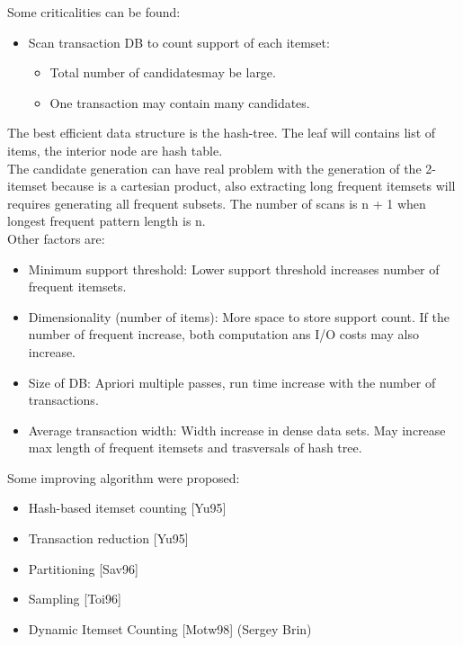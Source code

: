 \documentclass[12pt]{article}
\begin{document}
Some criticalities can be found:
\begin{itemize}
  \item Scan transaction DB to count support of each itemset:
  \begin{itemize}
    \item Total number of candidatesmay be large.
    \item One transaction may contain many candidates.
  \end{itemize}
\end{itemize}
The best efficient data structure is the hash-tree. The leaf will contains list of items, the interior node are hash table.\\
The candidate generation can have real problem with the generation of the 2-itemset because is a cartesian product, also extracting long frequent itemsets will requires generating all frequent subsets. The number of scans is n + 1 when longest frequent pattern length is n.\\
Other factors are:
\begin{itemize}
  \item Minimum support threshold: Lower support threshold increases number of frequent itemsets.
  \item Dimensionality (number of items): More space to store support count. If the number of frequent increase, both computation ans I/O costs may also increase.
  \item Size of DB: Apriori multiple passes, run time increase with the number of transactions.
  \item Average transaction width: Width increase in dense data sets. May increase max length of frequent itemsets and trasversals of hash tree.
\end{itemize}
Some improving algorithm were proposed:
\begin{itemize}
  \item Hash-based itemset counting [Yu95]
  \item Transaction reduction [Yu95]
  \item Partitioning [Sav96]
  \item Sampling [Toi96]
  \item Dynamic Itemset Counting [Motw98] (Sergey Brin)
\end{itemize}
\end{document}
